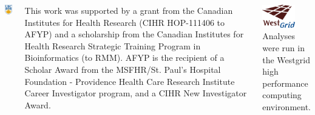 \documentclass[20pt, a0paper, landscape, colspace=10mm, blockverticalspace=10mm]{tikzposter}
\begin{document}
\begin{columns}
{\begin{minipage}{0.55\linewidth}
      \includegraphics[width=0.9in]{logos/ubc}
      \vspace{0.5cm}
    \end{minipage}
    \begin{adjustbox}{valign=t}
      \begin{minipage}[t]{0.45\linewidth}
        \small
        This work was supported by a grant from the Canadian Institutes for
        Health Research (CIHR HOP-111406 to AFYP) and a scholarship from the 
        Canadian Institutes for Health Research  Strategic Training Program in
        Bioinformatics (to RMM). AFYP is the recipient of a Scholar Award from
        the MSFHR/St. Paul’s Hospital Foundation - Providence Health Care
        Research Institute Career Investigator program, and a CIHR New
        Investigator Award.
      \end{minipage}
    \end{adjustbox}
  }

   {
    \renewcommand*{\bibfont}{\footnotesize}
    \printbibliography[heading=none]
    \small
    \includegraphics[height=1cm]{logos/westgrid} Analyses were run in the
    Westgrid high performance computing environment.
  }

\end{columns}
\end{document}
